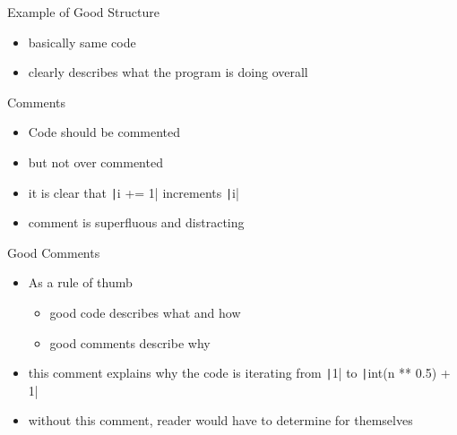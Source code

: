 \begin{frame}{Example of Good Structure}
    \pause
    \pause
    \begin{minipage}{0.3\textwidth}
        \vspace{-2in}\begin{itemize}[<+->]
            \item basically same code
            \item clearly describes what the program is doing \alert{overall}
        \end{itemize}
    \end{minipage}
\end{frame}

\begin{frame}{Comments}
    \pause
    \begin{itemize}[<+->]
        \item Code should be commented
        \item but not \alert{over commented}
    \end{itemize}
    \pause
    \pause
    \begin{itemize}[<+->]
        \item it is clear that \texttt|i += 1| increments \texttt|i|
        \item comment is superfluous and \alert{distracting}
    \end{itemize}
\end{frame}

\begin{frame}{Good Comments}
    \pause
    \begin{itemize}[<+->]
        \item As a rule of thumb
              \begin{itemize}[<+->]
                  \item good \alert{code} describes \alert{what} and \alert{how}
                  \item good \alert{comments} describe \alert{why}
              \end{itemize}
    \end{itemize}
    \pause
    \pause
    \begin{minipage}{0.35\textwidth}\vspace*{-1.75in}\begin{itemize}[<+->]
            \item this comment explains \alert{why} the code is iterating from \texttt|1| to \texttt|int(n ** 0.5) + 1|
            \item without this comment, reader would have to determine for themselves
        \end{itemize}\end{minipage}
\end{frame}


